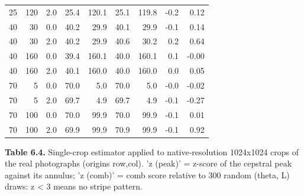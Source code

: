 \documentclass[10pt,a4paper]{article}
\begin{document}
\begin{table}[H]
{\begin{tabular}{rrrrrrrrr}
25 & 120 & 2.0 & 25.4 & 120.1 & 25.1 & 119.8 & -0.2 & 0.12\\
40 & 30 & 0.0 & 40.2 & 29.9 & 40.1 & 29.9 & -0.1 & 0.14\\
40 & 30 & 2.0 & 40.2 & 29.9 & 40.6 & 30.2 & 0.2 & 0.64\\
40 & 160 & 0.0 & 39.4 & 160.1 & 40.0 & 160.1 & 0.1 & -0.00\\
40 & 160 & 2.0 & 40.1 & 160.0 & 40.0 & 160.0 & 0.0 & 0.05\\
70 & 5 & 0.0 & 70.0 & 5.0 & 70.0 & 5.0 & -0.0 & -0.02\\
70 & 5 & 2.0 & 69.7 & 4.9 & 69.7 & 4.9 & -0.1 & -0.27\\
70 & 100 & 0.0 & 70.0 & 99.9 & 70.0 & 99.9 & -0.1 & 0.01\\
70 & 100 & 2.0 & 69.9 & 99.9 & 70.9 & 99.9 & -0.1 & 0.92\\
\bottomrule\end{tabular}}\end{table}
\begin{table}[H]\centering\scriptsize{\small\textbf{Table 6.4.} Single-crop estimator applied to native-resolution 1024x1024 crops of the real photographs (origins row,col). 'z (peak)' = z-score of the cepstral peak against its annulus; 'z (comb)' = comb score relative to 300 random (theta, L) draws: \textbar{}z\textbar{} \textless{} 3 means no stripe pattern.\par}\vskip 3pt
\end{table}
\end{document}
